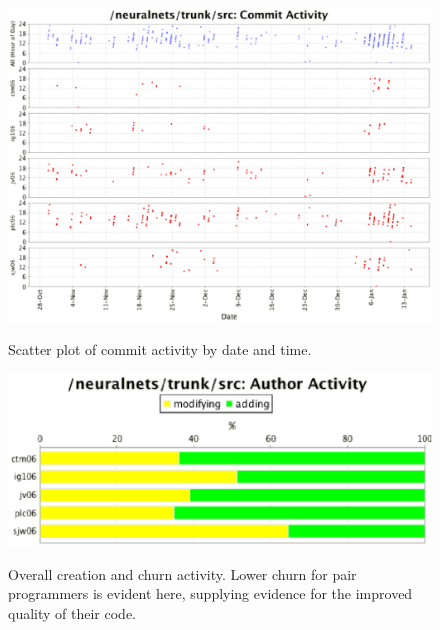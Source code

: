 \documentclass[11pt]{report}
\begin{document}
{\begin{figure}[h]
\centering
\scalebox{0.6} {
	\includegraphics{commitscatterauthors}
}
\caption{Scatter plot of commit activity by date and time.}
\label{fig:ast}
\end{figure}

\begin{figure}[h]
\centering
\scalebox{0.6} {
	\includegraphics{activity}
}
\caption{Overall creation and churn activity. Lower churn for pair programmers is evident here, supplying evidence for the improved quality of their code.}
\label{fig:persistence}
\end{figure}
}
\end{document}

